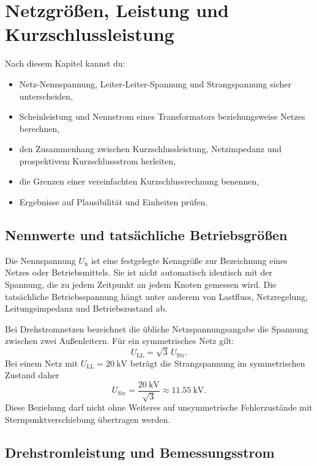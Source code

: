 \chapter{Netzgrößen, Leistung und Kurzschlussleistung}
\label{chap:netzgroessen}

\begin{lernziel}
Nach diesem Kapitel kannst du:
\begin{itemize}
  \item Netz-Nennspannung, Leiter-Leiter-Spannung und Strangspannung sicher unterscheiden,
  \item Scheinleistung und Nennstrom eines Transformators beziehungsweise Netzes berechnen,
  \item den Zusammenhang zwischen Kurzschlussleistung, Netzimpedanz und prospektivem Kurzschlussstrom herleiten,
  \item die Grenzen einer vereinfachten Kurzschlussrechnung benennen,
  \item Ergebnisse auf Plausibilität und Einheiten prüfen.
\end{itemize}
\end{lernziel}

\section{Nennwerte und tatsächliche Betriebsgrößen}

Die Nennspannung \(U_\mathrm{n}\) ist eine festgelegte Kenngröße zur Bezeichnung
eines Netzes oder Betriebsmittels. Sie ist nicht automatisch identisch mit der
Spannung, die zu jedem Zeitpunkt an jedem Knoten gemessen wird. Die tatsächliche
Betriebsspannung hängt unter anderem von Lastfluss, Netzregelung, Leitungsimpedanz
und Betriebszustand ab.

Bei Drehstromnetzen bezeichnet die übliche Netzspannungsangabe die Spannung
zwischen zwei Außenleitern. Für ein symmetrisches Netz gilt:
\[
U_\mathrm{LL}=\sqrt{3}\,U_\mathrm{Str}.
\]
Bei einem Netz mit \(U_\mathrm{LL}=\SI{20}{\kilo\volt}\) beträgt die
Strangspannung im symmetrischen Zustand daher
\[
U_\mathrm{Str}=\frac{\SI{20}{\kilo\volt}}{\sqrt{3}}
\approx \SI{11.55}{\kilo\volt}.
\]
Diese Beziehung darf nicht ohne Weiteres auf unsymmetrische Fehlerzustände
mit Sternpunktverschiebung übertragen werden.

\section{Drehstromleistung und Bemessungsstrom}

